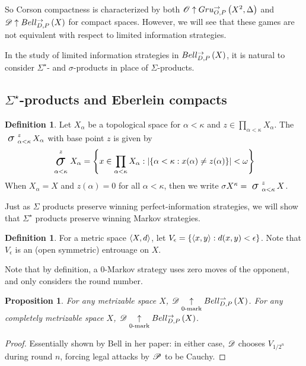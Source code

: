 \documentclass{amsart}
\newtheorem{proposition}[theorem]{Proposition}
\theoremstyle{definition}
\newtheorem{definition}[theorem]{Definition}
\begin{document}
  So Corson compactness is characterized by both
  \(\mathscr{O}\uparrow Gru_{O,P}^{\to}\left({X^2},{\Delta}\right)\) and
  \(\mathscr{D}\uparrow Bell_{D,P}^{\to}\left({X}\right)\) for compact spaces.
  However, we will see that these games are not
  equivalent with respect to limited information strategies.

  In the study of limited information strategies in \(Bell_{D,P}^{\to}\left({X}\right)\),
  it is natural to consider \(\Sigma^\star\)- and \(\sigma\)-products
  in place of \(\Sigma\)-products.


\subsection{\(\Sigma^\star\)-products and Eberlein compacts}

  \begin{definition}
    Let \(X_\alpha\) be a topological space for \(\alpha<\kappa\)
    and \(z\in\prod_{\alpha<\kappa}X_\alpha\).
    The  \(\sigmaProd_{\alpha<\kappa}^{z}X_\alpha\)
    with base point \(z\) is given by
    \[
      \sigmaProd_{\alpha<\kappa}^{z}X_\alpha
        =
      \left\{
        x\in \prod_{\alpha<\kappa}X_\alpha
      :
        |\{\alpha<\kappa:x(\alpha)\not=z(\alpha)\}|<\omega
      \right\}
    \]
    When \(X_\alpha=X\) and \(z(\alpha)=0\) for all \(\alpha<\kappa\),
    then we write \(\sigmaPower{X}{\kappa}=\sigmaProd_{\alpha<\kappa}^z X\).
  \end{definition}

  Just as \(\Sigma\) products preserve winning perfect-information strategies,
  we will show that \(\Sigma^\star\) products preserve winning
  Markov strategies.

  \begin{definition}
    For a metric space \(\langle X,d\rangle\), let
    \(V_\epsilon=\{\langle x,y\rangle:d(x,y)<\epsilon\}\). Note that \(V_\epsilon\)
    is an (open symmetric) entrouage on \(X\).
  \end{definition}

  Note that by definition, a \(0\)-Markov strategy uses zero moves of
  the opponent, and only considers the round number.

  \begin{proposition}
    For any metrizable space \(X\),
    \(\mathscr{D}\underset{0\text{-mark}}{\uparrow}Bell_{D,P}^{\rightharpoonup}\left({X}\right)\).
    For any completely metrizable space \(X\),
    \(\mathscr{D}\underset{0\text{-mark}}{\uparrow}Bell_{D,P}^{\to}\left({X}\right)\).
  \end{proposition}

  \begin{proof}
    Essentially shown by Bell in her paper: in either case,
    \(\mathscr{D}\) chooses \(V_{1/2^{n}}\)
    during round \(n\), forcing legal attacks by \(\mathscr{P}\) to be Cauchy.
  \end{proof}
\end{document}
